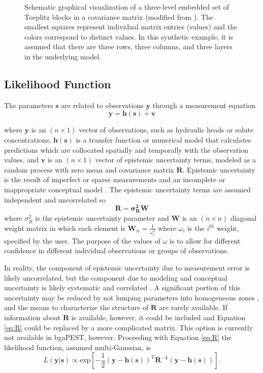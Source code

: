\documentclass[11pt,oneside,onecolumn]{usgsreport}
\begin{document}
\begin{appendix}
\begin{figure}[H]
\caption{\label{fig:toep}Schematic graphical visualization of a three-level
embedded set of Toeplitz blocks in a covariance matrix (modified from
\citet{MarcoDiss}). The smallest squares represent individual matrix
entries (values) and the colors correspond to distinct values. In
this synthetic example, it is assumed that there are three rows, three
columns, and three layers in the underlying model.}
\end{figure}



\subsection{Likelihood Function}

The parameters $\mathbf{s}$ are related to observations $\mathbf{y}$
through a measurement equation
\[
\mathbf{y=h(s)+v}
\]


where $\mathbf{y}$ is an $(n\times1)$ vector of observations, such
as hydraulic heads or solute concentrations, $\mathbf{h(s)}$ is a
transfer function or numerical model that calculates predictions which
are collocated spatially and temporally with the observation values,
and $\mathbf{v}$ is an $(n\times1)$ vector of epistemic uncertainty
terms, modeled as a random process with zero mean and covariance matrix
$\mathbf{R.}$ Epistemic uncertainty is the result of imperfect or
sparse measurements and an incomplete or inappropriate conceptual
model \citep[p. 4]{Rubin2003}. The epistemic uncertainty terms are
assumed independent and uncorrelated so
\begin{equation}
\mathbf{R=\sigma_{R}^{2}W}\label{eq:R}
\end{equation}
 where $\sigma_{R}^{2}$ is the epistemic uncertainty parameter and
\textbf{$\mathbf{W}$} is an $(n\times n)$ diagonal weight matrix
in which each element is $\mathbf{W}_{ii}=\frac{1}{\omega_{i}^{2}}$
where $\omega_{i}$ is the $i^{th}$ weight, specified by the user.
The purpose of the values of $\omega$ is to allow for different confidence
in different individual observations or groups of observations.

In reality, the component of epistemic uncertainty due to measurement
error is likely uncorrelated, but the component due to modeling and
conceptual uncertainty is likely systematic and correlated \citep{GaganisSmith2001}.
A significant portion of this uncertainty may be reduced by not lumping
parameters into homogeneous zones \citep{GallagherDoherty2007}, and
the means to characterize the structure of $\mathbf{R}$ are rarely
available. If information about $\mathbf{R}$ is available, however,
it could be included and Equation \ref{eq:R} could be replaced by
a more complicated matrix. This option is currently not available
in bgaPEST, however. Proceeding with Equation \ref{eq:R} the likelihood
function, assumed multi-Gaussian, is
\begin{equation}
L(\mathbf{y|s})\propto\mathrm{exp\left[-\frac{1}{2}\left(\mathbf{y-h}(\mathbf{s})\right)^{T}\mathbf{R^{-1}\left(\mathbf{y-h}(\mathbf{s})\right)}\right].}\label{eq:likelihood}
\end{equation}



\end{appendix}
\end{document}
